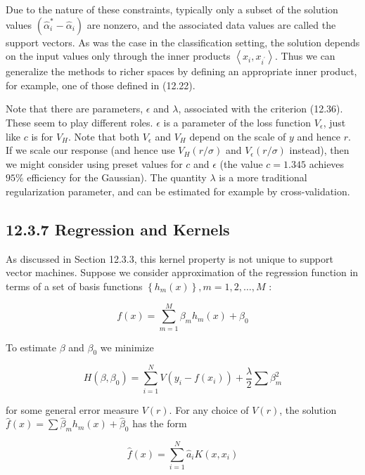 \documentclass[10pt]{article}
\begin{document}
Due to the nature of these constraints, typically only a subset of the solution values $\left(\hat{\alpha}_{i}^{*}-\hat{\alpha}_{i}\right)$ are nonzero, and the associated data values are called the support vectors. As was the case in the classification setting, the solution depends on the input values only through the inner products $\left\langle x_{i}, x_{i^{\prime}}\right\rangle$. Thus we can generalize the methods to richer spaces by defining an appropriate inner product, for example, one of those defined in (12.22).

Note that there are parameters, $\epsilon$ and $\lambda$, associated with the criterion (12.36). These seem to play different roles. $\epsilon$ is a parameter of the loss function $V_{\epsilon}$, just like $c$ is for $V_{H}$. Note that both $V_{\epsilon}$ and $V_{H}$ depend on the scale of $y$ and hence $r$. If we scale our response (and hence use $V_{H}(r / \sigma)$ and $V_{\epsilon}(r / \sigma)$ instead), then we might consider using preset values for $c$ and $\epsilon$ (the value $c=1.345$ achieves $95 \%$ efficiency for the Gaussian). The quantity $\lambda$ is a more traditional regularization parameter, and can be estimated for example by cross-validation.

\subsection*{12.3.7 Regression and Kernels}
As discussed in Section 12.3.3, this kernel property is not unique to support vector machines. Suppose we consider approximation of the regression function in terms of a set of basis functions $\left\{h_{m}(x)\right\}, m=1,2, \ldots, M$ :


\begin{equation*}
f(x)=\sum_{m=1}^{M} \beta_{m} h_{m}(x)+\beta_{0} \tag{12.42}
\end{equation*}


To estimate $\beta$ and $\beta_{0}$ we minimize


\begin{equation*}
H\left(\beta, \beta_{0}\right)=\sum_{i=1}^{N} V\left(y_{i}-f\left(x_{i}\right)\right)+\frac{\lambda}{2} \sum \beta_{m}^{2} \tag{12.43}
\end{equation*}


for some general error measure $V(r)$. For any choice of $V(r)$, the solution $\hat{f}(x)=\sum \hat{\beta}_{m} h_{m}(x)+\hat{\beta}_{0}$ has the form


\begin{equation*}
\hat{f}(x)=\sum_{i=1}^{N} \hat{a}_{i} K\left(x, x_{i}\right) \tag{12.44}
\end{equation*}
\end{document}
